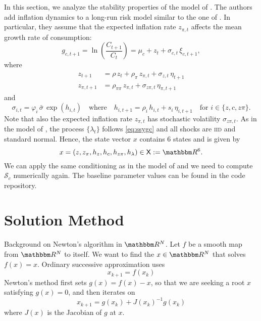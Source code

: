 \documentclass[12pt, reqno]{amsart}
\newcommand{\1}{\mathbbm 1}
\newcommand{\sS}{\mathcal S}
\newcommand{\RR}{\mathbbm R}
\newcommand{\XX}{\mathsf X}
\renewcommand{\phi}{\varphi}
\theoremstyle{plain}
\theoremstyle{definition}
\begin{document}
In this section, we analyze the stability properties of the model of
\cite{GomezYaron2020}. The authors add inflation dynamics to a long-run risk
model similar to the one of \cite{schorfheide2018identifying}. In particular,
they assume that the expected inflation rate $z_{\pi,t}$ affects the mean growth
rate of consumption:
%
\begin{equation}\label{eq:gcycg}
	g_{c, t+1} 
	= \ln \left( \frac{C_{t+1}}{C_t} \right)    
	= \mu_c + z_t + \sigma_{c, t} \, \xi_{c, t+1},
\end{equation}
%
where
%
\begin{align*}
	z_{t+1} 
	&= \rho \, z_t + \rho_{\pi} \, z_{\pi,t}+ 
	\sigma_{z, t} \, \eta_{t+1}\\
	z_{\pi,t+1} 
	&= \rho_{\pi \pi} \, z_{\pi,t} + \sigma_{z \pi, t} \, \eta_{\pi,t+1}
\end{align*}
%
and
%
\begin{equation*}
	\sigma_{i,t} 
	= \phi_i \, \bar{\sigma} \, \exp(h_{i, t})
	\quad \text{where} \quad
	h_{i, t+1}
	= \rho_i \, h_{i,t} + s_i \, \eta_{i, t+1}
	\quad \text{for } i \in \{z, c, z\pi \}.
\end{equation*}
%
Note that also the expected inflation rate $z_{\pi,t}$ has stochastic volatility
$\sigma_{z\pi,t}$. As in the model of \cite{schorfheide2018identifying}, the
process $\{\lambda_t\}$ follows \eqref{eq:ssygc} and all shocks are
\textsc{iid} and standard normal. Hence, the state vector $x$ contains 6 states
and is given by
%
\begin{equation*}
    x = (z, z_\pi, h_z, h_c, h_{z\pi}, h_\lambda) \in \XX := \RR^6. 
\end{equation*}
%
We can apply the same conditioning as in the model of
\cite{schorfheide2018identifying} and we need to compute $\sS_c$ numerically
again. The baseline parameter values can be found in the code repository.



\section{Solution Method}

Background on Newton's algorithm in $\RR^N$.  Let $f$ be a smooth map from
$\RR^N$ to itself.  We want to find the $x \in \RR^N$ that solves $f(x)=x$.
Ordinary successive approximation uses
%
\begin{equation}
    x_{k+1} = f(x_k)
\end{equation}
%
Newton's method first sets $g(x) = f(x) -x$, so that we are seeking a root $x$
satisfying $g(x)=0$, and then iterates on
%
\begin{equation}
    x_{k+1} = g(x_k) + J(x_k)^{-1} g(x_k)
\end{equation}
%
where $J(x)$ is the Jacobian of $g$ at $x$.
\end{document}
